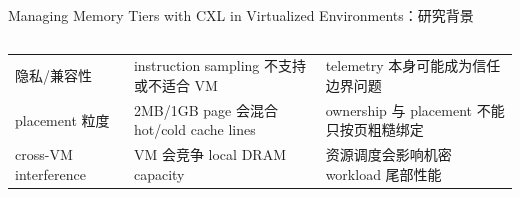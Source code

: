 \begin{frame}[t,shrink=6]{Managing Memory Tiers with CXL in Virtualized Environments：研究背景}
\begin{columns}[T,totalwidth=\textwidth]
\begin{column}{0.49\textwidth}
{\begin{minipage}[t]{0.97\linewidth}
\begin{minipage}{0.92\linewidth}
{\begin{tabularx}{\linewidth}{@{}YYY@{}}
隐私/兼容性 & instruction sampling 不支持或不适合 VM & telemetry 本身可能成为信任边界问题 \\
placement 粒度 & 2MB/1GB page 会混合 hot/cold cache lines & ownership 与 placement 不能只按页粗糙绑定 \\
cross-VM interference & VM 会竞争 local DRAM capacity & 资源调度会影响机密 workload 尾部性能 \\
\bottomrule
\end{tabularx}
}
    \end{minipage}
    \vspace{1mm}
  \end{minipage}}
  \end{column}
\end{columns}
\end{frame}


